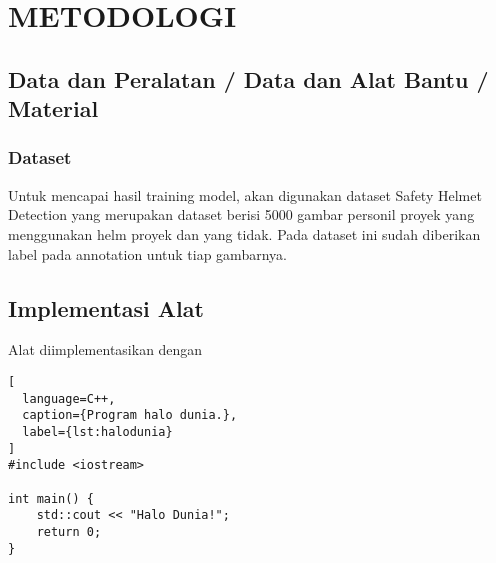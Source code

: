 \chapter{METODOLOGI}
\label{chap:desainimplementasi}



\section{Data dan Peralatan / Data dan Alat Bantu / Material}
\label{sec:perlengkapan}

\subsection{Dataset}
Untuk mencapai hasil training model, akan digunakan dataset Safety Helmet Detection yang merupakan dataset berisi 5000 gambar personil proyek yang menggunakan helm proyek dan yang tidak. Pada dataset ini sudah diberikan label pada annotation untuk tiap gambarnya.

\section{Implementasi Alat
\label{sec:implementasi alat}}

Alat diimplementasikan dengan \lipsum[1]

\begin{lstlisting}[
  language=C++,
  caption={Program halo dunia.},
  label={lst:halodunia}
]
#include <iostream>

int main() {
    std::cout << "Halo Dunia!";
    return 0;
}
\end{lstlisting}

\lipsum[2-3]



\lipsum[4]
